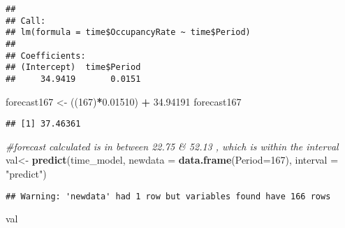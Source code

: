 \documentclass[]{article}
\newenvironment{Shaded}{\begin{snugshade}}{\end{snugshade}}
\newcommand{\KeywordTok}[1]{\textcolor[rgb]{0.13,0.29,0.53}{\textbf{#1}}}
\newcommand{\DataTypeTok}[1]{\textcolor[rgb]{0.13,0.29,0.53}{#1}}
\newcommand{\DecValTok}[1]{\textcolor[rgb]{0.00,0.00,0.81}{#1}}
\newcommand{\FloatTok}[1]{\textcolor[rgb]{0.00,0.00,0.81}{#1}}
\newcommand{\StringTok}[1]{\textcolor[rgb]{0.31,0.60,0.02}{#1}}
\newcommand{\CommentTok}[1]{\textcolor[rgb]{0.56,0.35,0.01}{\textit{#1}}}
\newcommand{\OperatorTok}[1]{\textcolor[rgb]{0.81,0.36,0.00}{\textbf{#1}}}
\newcommand{\NormalTok}[1]{#1}
\begin{document}
\begin{verbatim}
## 
## Call:
## lm(formula = time$OccupancyRate ~ time$Period)
## 
## Coefficients:
## (Intercept)  time$Period  
##     34.9419       0.0151
\end{verbatim}

\begin{Shaded}
\begin{Highlighting}[]
\NormalTok{forecast167 <-}\StringTok{ }\NormalTok{((}\DecValTok{167}\NormalTok{)}\OperatorTok{*}\FloatTok{0.01510}\NormalTok{) }\OperatorTok{+}\StringTok{ }\FloatTok{34.94191}
\NormalTok{forecast167}
\end{Highlighting}
\end{Shaded}

\begin{verbatim}
## [1] 37.46361
\end{verbatim}

\begin{Shaded}
\begin{Highlighting}[]
\CommentTok{#forecast calculated is in between 22.75 & 52.13 , which is within the interval}
\NormalTok{val<-}\StringTok{ }\KeywordTok{predict}\NormalTok{(time_model, }\DataTypeTok{newdata =} \KeywordTok{data.frame}\NormalTok{(}\DataTypeTok{Period=}\DecValTok{167}\NormalTok{), }\DataTypeTok{interval =} \StringTok{"predict"}\NormalTok{)}
\end{Highlighting}
\end{Shaded}

\begin{verbatim}
## Warning: 'newdata' had 1 row but variables found have 166 rows
\end{verbatim}

\begin{Shaded}
\begin{Highlighting}[]
\NormalTok{val}
\end{Highlighting}
\end{Shaded}
\end{document}
